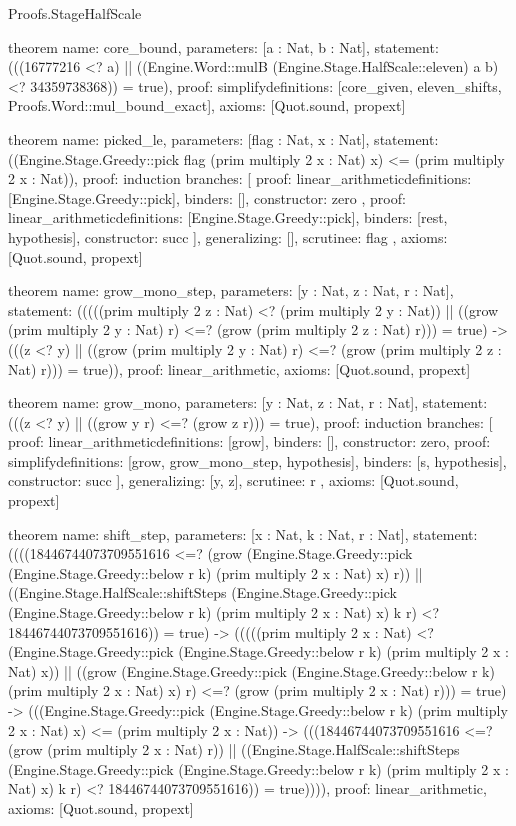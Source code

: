 \begin{lexlean}{Proofs.StageHalfScale}
\begin{semanticmodule}
theorem{
  name: core_bound,
  parameters: [a : Nat, b : Nat],
  statement: (((16777216 <? a) || ((Engine.Word::mulB (Engine.Stage.HalfScale::eleven) a b) <? 34359738368)) = true),
  proof: simplify{definitions: [core_given, eleven_shifts, Proofs.Word::mul_bound_exact]},
  axioms: [Quot.sound, propext]
}

theorem{
  name: picked_le,
  parameters: [flag : Nat, x : Nat],
  statement: ((Engine.Stage.Greedy::pick flag (prim multiply 2 x : Nat) x) <= (prim multiply 2 x : Nat)),
  proof: induction{
    branches: [
      {
        proof: linear_arithmetic{definitions: [Engine.Stage.Greedy::pick]},
        binders: [],
        constructor: zero
      },
      {
        proof: linear_arithmetic{definitions: [Engine.Stage.Greedy::pick]},
        binders: [rest, hypothesis],
        constructor: succ
      }
    ],
    generalizing: [],
    scrutinee: flag
  },
  axioms: [Quot.sound, propext]
}

theorem{
  name: grow_mono_step,
  parameters: [y : Nat, z : Nat, r : Nat],
  statement: (((((prim multiply 2 z : Nat) <? (prim multiply 2 y : Nat)) || ((grow (prim multiply 2 y : Nat) r) <=? (grow (prim multiply 2 z : Nat) r))) = true) -> (((z <? y) || ((grow (prim multiply 2 y : Nat) r) <=? (grow (prim multiply 2 z : Nat) r))) = true)),
  proof: linear_arithmetic{},
  axioms: [Quot.sound, propext]
}

theorem{
  name: grow_mono,
  parameters: [y : Nat, z : Nat, r : Nat],
  statement: (((z <? y) || ((grow y r) <=? (grow z r))) = true),
  proof: induction{
    branches: [
      {proof: linear_arithmetic{definitions: [grow]}, binders: [], constructor: zero},
      {
        proof: simplify{definitions: [grow, grow_mono_step, hypothesis]},
        binders: [s, hypothesis],
        constructor: succ
      }
    ],
    generalizing: [y, z],
    scrutinee: r
  },
  axioms: [Quot.sound, propext]
}

theorem{
  name: shift_step,
  parameters: [x : Nat, k : Nat, r : Nat],
  statement: ((((18446744073709551616 <=? (grow (Engine.Stage.Greedy::pick (Engine.Stage.Greedy::below r k) (prim multiply 2 x : Nat) x) r)) || ((Engine.Stage.HalfScale::shiftSteps (Engine.Stage.Greedy::pick (Engine.Stage.Greedy::below r k) (prim multiply 2 x : Nat) x) k r) <? 18446744073709551616)) = true) -> (((((prim multiply 2 x : Nat) <? (Engine.Stage.Greedy::pick (Engine.Stage.Greedy::below r k) (prim multiply 2 x : Nat) x)) || ((grow (Engine.Stage.Greedy::pick (Engine.Stage.Greedy::below r k) (prim multiply 2 x : Nat) x) r) <=? (grow (prim multiply 2 x : Nat) r))) = true) -> (((Engine.Stage.Greedy::pick (Engine.Stage.Greedy::below r k) (prim multiply 2 x : Nat) x) <= (prim multiply 2 x : Nat)) -> (((18446744073709551616 <=? (grow (prim multiply 2 x : Nat) r)) || ((Engine.Stage.HalfScale::shiftSteps (Engine.Stage.Greedy::pick (Engine.Stage.Greedy::below r k) (prim multiply 2 x : Nat) x) k r) <? 18446744073709551616)) = true)))),
  proof: linear_arithmetic{},
  axioms: [Quot.sound, propext]
}


\end{semanticmodule}
\end{lexlean}
